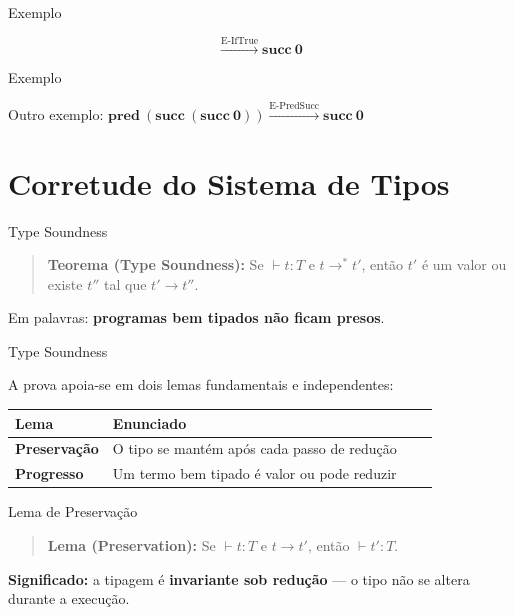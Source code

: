 \begin{frame}{Exemplo}

    \[\xrightarrow{\text{E-IfTrue}}
    \mathbf{succ}\ \mathbf{0}\]
\end{frame}

\begin{frame}{Exemplo}

    Outro exemplo:
    \(\mathbf{pred}\ (\mathbf{succ}\ (\mathbf{succ}\ \mathbf{0})) \xrightarrow{\text{E-PredSucc}} \mathbf{succ}\ \mathbf{0}\)
\end{frame}


\section{Corretude do Sistema de
Tipos}\label{corretude-do-sistema-de-tipos}

\begin{frame}{Type Soundness}

    \begin{quote}
        \textbf{Teorema (Type Soundness):} Se \(\vdash t : T\) e \(t \to^* t'\),
        então \(t'\) é um valor ou existe \(t''\) tal que \(t' \to t''\).
    \end{quote}

    Em palavras: \textbf{programas bem tipados não ficam presos}.
\end{frame}

\begin{frame}{Type Soundness}

    A prova apoia-se em dois lemas fundamentais e independentes:

    \begin{table}
        \begin{tabular}{l l l l}
            \hline
            Lema & Enunciado \\
            \hline
            \textbf{Preservação} & O tipo se mantém após cada passo de redução \\
            \textbf{Progresso} & Um termo bem tipado é valor ou pode reduzir \\
            \hline
        \end{tabular}
    \end{table}
\end{frame}

\begin{frame}{Lema de Preservação}

    \begin{quote}
        \textbf{Lema (Preservation):} Se \(\vdash t : T\) e \(t \to t'\), então
        \(\vdash t' : T\).
    \end{quote}

    \textbf{Significado:} a tipagem é \textbf{invariante sob redução} --- o
    tipo não se altera durante a execução.
\end{frame}

